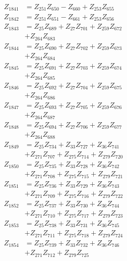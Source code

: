 \begin{multicols}{2}
\begin{align}
Z_{1841} &= Z_{251}Z_{650} - Z_{660} + Z_{253}Z_{655} \nonumber \\
Z_{1842} &= Z_{251}Z_{651} - Z_{661} + Z_{253}Z_{656} \nonumber \\
Z_{1843} &= Z_{25}Z_{689} + Z_{27}Z_{701} + Z_{259}Z_{672}  \nonumber \\
&+ Z_{264}Z_{683} \nonumber \\
Z_{1844} &= Z_{25}Z_{690} + Z_{27}Z_{702} + Z_{259}Z_{673}  \nonumber \\
&+ Z_{264}Z_{684} \nonumber \\
Z_{1845} &= Z_{25}Z_{691} + Z_{27}Z_{703} + Z_{259}Z_{674}  \nonumber \\
&+ Z_{264}Z_{685} \nonumber \\
Z_{1846} &= Z_{25}Z_{692} + Z_{27}Z_{704} + Z_{259}Z_{675}  \nonumber \\
&+ Z_{264}Z_{686} \nonumber \\
Z_{1847} &= Z_{25}Z_{693} + Z_{27}Z_{705} + Z_{259}Z_{676}  \nonumber \\
&+ Z_{264}Z_{687} \nonumber \\
Z_{1848} &= Z_{25}Z_{694} + Z_{27}Z_{706} + Z_{259}Z_{677}  \nonumber \\
&+ Z_{264}Z_{688} \nonumber \\
Z_{1849} &= Z_{25}Z_{734} + Z_{33}Z_{727} + Z_{36}Z_{741}  \nonumber \\
&+ Z_{271}Z_{707} + Z_{275}Z_{714} + Z_{279}Z_{720} \nonumber \\
Z_{1850} &= Z_{25}Z_{735} + Z_{33}Z_{728} + Z_{36}Z_{742}  \nonumber \\
&+ Z_{271}Z_{708} + Z_{275}Z_{715} + Z_{279}Z_{721} \nonumber \\
Z_{1851} &= Z_{25}Z_{736} + Z_{33}Z_{729} + Z_{36}Z_{743}  \nonumber \\
&+ Z_{271}Z_{709} + Z_{275}Z_{716} + Z_{279}Z_{722} \nonumber \\
Z_{1852} &= Z_{25}Z_{737} + Z_{33}Z_{730} + Z_{36}Z_{744}  \nonumber \\
&+ Z_{271}Z_{710} + Z_{275}Z_{717} + Z_{279}Z_{723} \nonumber \\
Z_{1853} &= Z_{25}Z_{738} + Z_{33}Z_{731} + Z_{36}Z_{745}  \nonumber \\
&+ Z_{271}Z_{711} + Z_{275}Z_{718} + Z_{279}Z_{724} \nonumber \\
Z_{1854} &= Z_{25}Z_{739} + Z_{33}Z_{732} + Z_{36}Z_{746}  \nonumber \\
&+ Z_{271}Z_{712} + Z_{279}Z_{725} \nonumber \\

\end{align}
\end{multicols}
